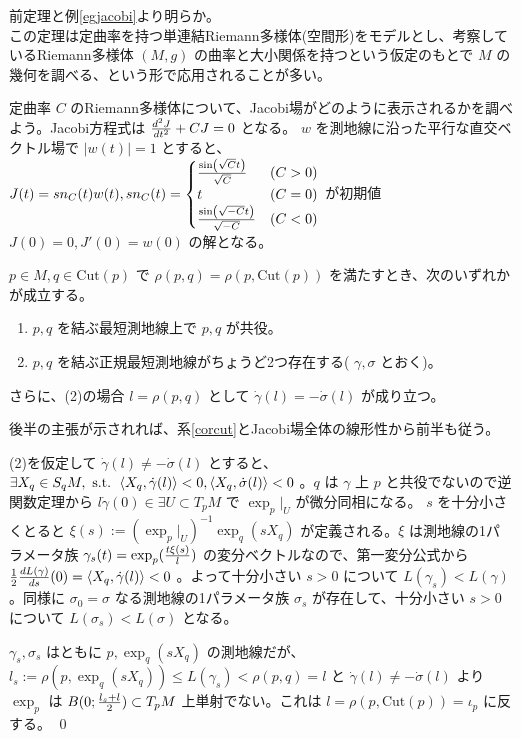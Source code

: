 \documentclass[dvipdfmx,a4paper]{jsreport}
\theoremstyle{definition}
\begin{document}
\prf 前定理と例\ref{egjacobi}より明らか。
\\

この定理は定曲率を持つ単連結Riemann多様体(空間形)をモデルとし、考察しているRiemann多様体 $(M,g)$ の曲率と大小関係を持つという仮定のもとで $M$ の幾何を調べる、という形で応用されることが多い。

定曲率 $C$ のRiemann多様体について、Jacobi場がどのように表示されるかを調べよう。Jacobi方程式は ${d^2 J \over dt^2}+CJ=0$ となる。 $w$ を測地線に沿った平行な直交ベクトル場で $|w(t)|=1$ とすると、 $J(t)=sn_C(t)w(t),sn_C(t)=\begin{cases}
    {\sin(\sqrt{C}t) \over \sqrt{C}} & (C>0) \\
    t & (C=0) \\
    {\sin(\sqrt{-C}t) \over \sqrt{-C}} & (C<0)
\end{cases}$ が初期値 $J(0)=0,J'(0)=w(0)$ の解となる。

\lem $p \in M,q \in \mbox{Cut}(p)$ で $\rho(p,q)=\rho(p,\mbox{Cut}(p))$ を満たすとき、次のいずれかが成立する。
\begin{enumerate}
    \item $p,q$ を結ぶ最短測地線上で $p,q$ が共役。
    \item $p,q$ を結ぶ正規最短測地線がちょうど2つ存在する( $\gamma,\sigma$ とおく)。
\end{enumerate}

さらに、(2)の場合 $l=\rho(p,q)$ として $\dot{\gamma}(l)=-\dot{\sigma}(l)$ が成り立つ。 

\prf 後半の主張が示されれば、系\ref{corcut}とJacobi場全体の線形性から前半も従う。

(2)を仮定して $\dot{\gamma}(l) \neq -\dot{\sigma}(l)$ とすると、$\exists X_q \in S_qM,\mbox{ s.t. } \ev{X_q,\dot{\gamma}(l)}<0,\ev{X_q,\dot{\sigma}(l)}<0$ 。$q$ は $\gamma$ 上 $p$ と共役でないので逆関数定理から $l\dot{\gamma}(0) \in \exists U \subset T_pM$ で $\exp_p|_U$ が微分同相になる。 $s$ を十分小さくとると $\xi(s):=(\exp_p|_U)^{-1}\exp_q(sX_q)$ が定義される。$\xi$ は測地線の1パラメータ族 ${\gamma}_s(t)=\exp_p({t\xi(s) \over l})$ の変分ベクトルなので、第一変分公式から ${1 \over 2}{dL({\gamma}) \over ds}(0)=\ev{X_q,\dot{\gamma}(l)}<0$ 。よって十分小さい $s>0$ について $L({\gamma}_s)<L(\gamma)$ 。同様に $\sigma_0=\sigma$ なる測地線の1パラメータ族 $\sigma_s$ が存在して、十分小さい $s>0$ について $L({\sigma}_s)<L(\sigma)$ となる。

$\gamma_s,\sigma_s$ はともに $p,\exp_q(sX_q)$ の測地線だが、 $l_s:=\rho(p,\exp_q(sX_q)) \leq L(\gamma_s)<\rho(p,q)=l$ と $\dot{\gamma}(l) \neq -\dot{\sigma}(l)$ より $\exp_p$ は $B(0;{l_s+l \over 2}) \subset T_pM$ 上単射でない。これは $l=\rho(p,\mbox{Cut}(p))=\iota_p$ に反する。 \qed 
\end{document}

